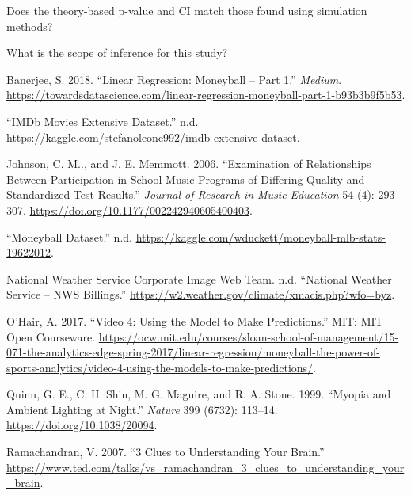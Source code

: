 \documentclass[
]{report}
\newcommand{\rgi}{\hspace{24pt}}  %
\newlength{\cslhangindent}
\newenvironment{CSLReferences}[2] %
 {%
  \setlength{\parindent}{0pt}
  \ifodd #1 \everypar{\setlength{\hangindent}{\cslhangindent}}\ignorespaces\fi
  \ifnum #2 > 0
  \setlength{\parskip}{#2\baselineskip}
  \fi
 }%
 {}
\begin{document}
\rgi Does the theory-based p-value and CI match those found using simulation methods?

\vspace{0.8in}

\rgi What is the scope of inference for this study?

\vspace{0.8in}

\newpage

\hypertarget{refs}{}
\begin{CSLReferences}{1}{0}
\leavevmode{}%
Banerjee, S. 2018. {``Linear Regression: Moneyball -- Part 1.''} \emph{Medium}. \url{https://towardsdatascience.com/linear-regression-moneyball-part-1-b93b3b9f5b53}.

\leavevmode{}%
{``{IMDb} Movies Extensive Dataset.''} n.d. \url{https://kaggle.com/stefanoleone992/imdb-extensive-dataset}.

\leavevmode{}%
Johnson, C. M.., and J. E. Memmott. 2006. {``Examination of Relationships Between Participation in School Music Programs of Differing Quality and Standardized Test Results.''} \emph{Journal of Research in Music Education} 54 (4): 293--307. \url{https://doi.org/10.1177/002242940605400403}.

\leavevmode{}%
{``Moneyball Dataset.''} n.d. \url{https://kaggle.com/wduckett/moneyball-mlb-stats-19622012}.

\leavevmode{}%
National Weather Service Corporate Image Web Team. n.d. {``National Weather Service -- {NWS} Billings.''} \url{https://w2.weather.gov/climate/xmacis.php?wfo=byz}.

\leavevmode{}%
O'Hair, A. 2017. {``Video 4: Using the Model to Make Predictions.''} {MIT}: {MIT Open Courseware}. \url{https://ocw.mit.edu/courses/sloan-school-of-management/15-071-the-analytics-edge-spring-2017/linear-regression/moneyball-the-power-of-sports-analytics/video-4-using-the-models-to-make-predictions/}.

\leavevmode{}%
Quinn, G. E., C. H. Shin, M. G. Maguire, and R. A. Stone. 1999. {``Myopia and Ambient Lighting at Night.''} \emph{Nature} 399 (6732): 113--14. \url{https://doi.org/10.1038/20094}.

\leavevmode{}%
Ramachandran, V. 2007. {``3 Clues to Understanding Your Brain.''} \url{https://www.ted.com/talks/vs_ramachandran_3_clues_to_understanding_your_brain}.


\end{CSLReferences}
\end{document}
